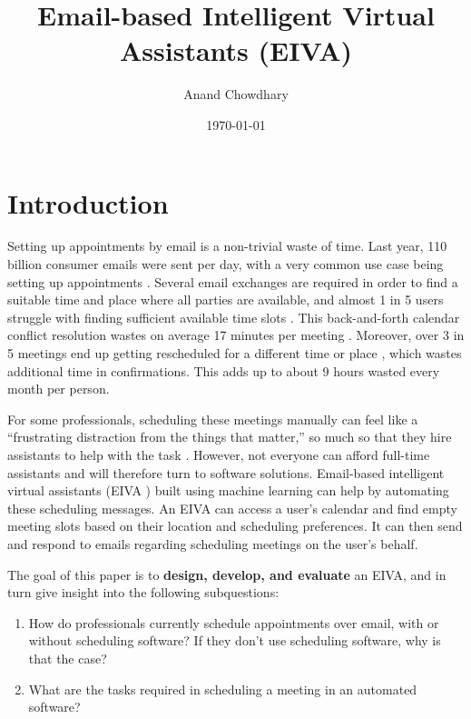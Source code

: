 \documentclass{article}
\title{Email-based Intelligent Virtual Assistants (EIVA)}
\author{Anand Chowdhary}
\date{\today}
\begin{document}
  \maketitle
  \newpage
  \tableofcontents
  \newpage
  \listoffigures
  \enspace
  \listoftables
  \newpage
  

\section{Introduction}

Setting up appointments by email is a non-trivial waste of time. Last year, 110 billion consumer emails were sent per day, with a very common use case being setting up appointments \cite{noauthor_email_2019}. Several email exchanges are required in order to find a suitable time and place where all parties are available, and almost 1 in 5 users struggle with finding sufficient available time slots \cite{blaszkiewicz_research_2018}. This back-and-forth calendar conflict resolution wastes on average 17 minutes per meeting \cite{dennis_4_2017}. Moreover, over 3 in 5 meetings end up getting rescheduled for a different time or place \cite{dennis_how_2018}, which wastes additional time in confirmations. This adds up to about 9 hours wasted every month per person.

For some professionals, scheduling these meetings manually can feel like a “frustrating distraction from the things that matter,” so much so that they hire assistants to help with the task \cite{cranshaw_calendarhelp_2017}. However, not everyone can afford full-time assistants and will therefore turn to software solutions. Email-based intelligent virtual assistants (EIVA ) built using machine learning can help by automating these scheduling messages. An EIVA can access a user’s calendar and find empty meeting slots based on their location and scheduling preferences. It can then send and respond to emails regarding scheduling meetings on the user’s behalf.

The goal of this paper is to \textbf{design, develop, and evaluate} an EIVA, and in turn give insight into the following subquestions:

\begin{enumerate}
  \item How do professionals currently schedule appointments over email, with or without scheduling software? If they don’t use scheduling software, why is that the case?
  \item What are the tasks required in scheduling a meeting in an automated software?
\end{enumerate}
\end{document}
